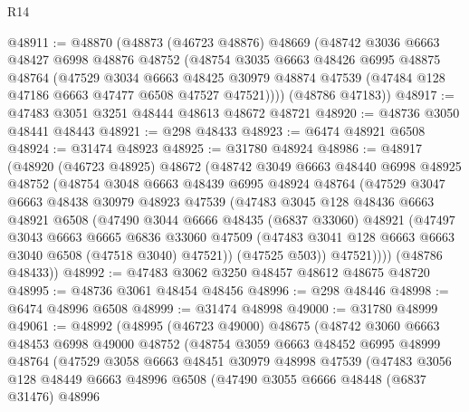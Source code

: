 \begin{lexlean}{R14}
\begin{coremodule}
@48911 := @48870
    (@48873
      (@46723 @48876)
      @48669
      (@48742
        @3036
        @6663
        @48427
        @6998
        @48876
        @48752
        (@48754
          @3035
          @6663
          @48426
          @6995
          @48875
          @48764
          (@47529
            @3034
            @6663
            @48425
            @30979
            @48874
            @47539
            (@47484 @128 @47186 @6663 @47477 @6508 @47527 @47521))))
      (@48786 @47183))
@48917 := @47483 @3051 @3251 @48444 @48613 @48672 @48721
@48920 := @48736 @3050 @48441 @48443
@48921 := @298 @48433
@48923 := @6474 @48921 @6508
@48924 := @31474 @48923
@48925 := @31780 @48924
@48986 := @48917
    (@48920
      (@46723 @48925)
      @48672
      (@48742
        @3049
        @6663
        @48440
        @6998
        @48925
        @48752
        (@48754
          @3048
          @6663
          @48439
          @6995
          @48924
          @48764
          (@47529
            @3047
            @6663
            @48438
            @30979
            @48923
            @47539
            (@47483
              @3045
              @128
              @48436
              @6663
              @48921
              @6508
              (@47490
                @3044
                @6666
                @48435
                (@6837 @33060)
                @48921
                (@47497
                  @3043
                  @6663
                  @6665
                  @6836
                  @33060
                  @47509
                  (@47483 @3041 @128 @6663 @6663 @3040 @6508 (@47518 @3040) @47521))
                (@47525 @503))
              @47521))))
      (@48786 @48433))
@48992 := @47483 @3062 @3250 @48457 @48612 @48675 @48720
@48995 := @48736 @3061 @48454 @48456
@48996 := @298 @48446
@48998 := @6474 @48996 @6508
@48999 := @31474 @48998
@49000 := @31780 @48999
@49061 := @48992
    (@48995
      (@46723 @49000)
      @48675
      (@48742
        @3060
        @6663
        @48453
        @6998
        @49000
        @48752
        (@48754
          @3059
          @6663
          @48452
          @6995
          @48999
          @48764
          (@47529
            @3058
            @6663
            @48451
            @30979
            @48998
            @47539
            (@47483
              @3056
              @128
              @48449
              @6663
              @48996
              @6508
              (@47490
                @3055
                @6666
                @48448
                (@6837 @31476)
                @48996

\end{coremodule}
\end{lexlean}
